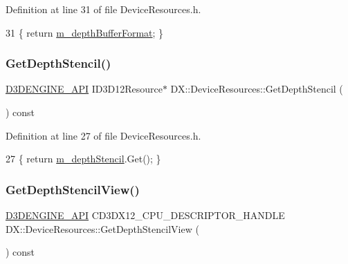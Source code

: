 Definition at line 31 of file Device\+Resources.\+h.


\begin{DoxyCode}
31 \{ \textcolor{keywordflow}{return} \mbox{\hyperlink{class_d_x_1_1_device_resources_afb117f121edb8eb4df707d3f1b15445a}{m\_depthBufferFormat}}; \}
\end{DoxyCode}
\mbox{\label{class_d_x_1_1_device_resources_abb849df3775f377ef3e3625b5b43fa5b}} 
\subsubsection{\texorpdfstring{Get\+Depth\+Stencil()}{GetDepthStencil()}}
{\footnotesize\ttfamily \mbox{\hyperlink{stdafx_8h_a8ee2d990c5dfba7794dd2b60741d7722}{D3\+D\+E\+N\+G\+I\+N\+E\+\_\+\+A\+PI}} I\+D3\+D12\+Resource$\ast$ D\+X\+::\+Device\+Resources\+::\+Get\+Depth\+Stencil (\begin{DoxyParamCaption}{ }\end{DoxyParamCaption}) const\hspace{0.3cm}{\ttfamily [inline]}}



Definition at line 27 of file Device\+Resources.\+h.


\begin{DoxyCode}
27 \{ \textcolor{keywordflow}{return} \mbox{\hyperlink{class_d_x_1_1_device_resources_a98406a085f056b96a7c60ad257598fd3}{m\_depthStencil}}.Get(); \}
\end{DoxyCode}
\mbox{\label{class_d_x_1_1_device_resources_ab2a956c30e147ba5f96f13aa13fbb25a}} 
\subsubsection{\texorpdfstring{Get\+Depth\+Stencil\+View()}{GetDepthStencilView()}}
{\footnotesize\ttfamily \mbox{\hyperlink{stdafx_8h_a8ee2d990c5dfba7794dd2b60741d7722}{D3\+D\+E\+N\+G\+I\+N\+E\+\_\+\+A\+PI}} C\+D3\+D\+X12\+\_\+\+C\+P\+U\+\_\+\+D\+E\+S\+C\+R\+I\+P\+T\+O\+R\+\_\+\+H\+A\+N\+D\+LE D\+X\+::\+Device\+Resources\+::\+Get\+Depth\+Stencil\+View (\begin{DoxyParamCaption}{ }\end{DoxyParamCaption}) const\hspace{0.3cm}{\ttfamily [inline]}}



